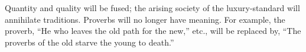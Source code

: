Quantity and quality will be fused; the arising society of the luxury-standard will annihilate traditions. Proverbs will no longer have meaning. For example, the proverb, ``He who leaves the old path for the new,'' etc., will be replaced by, ``The proverbs of the old starve the young to death.''
